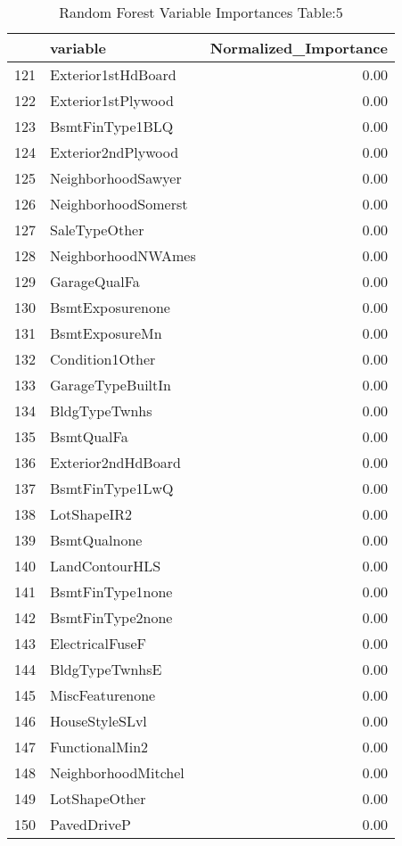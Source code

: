 \begin{table}[ht]
\centering
\begin{tabular}{rlr}
  \hline
 & variable & Normalized\_Importance \\ 
  \hline
121 & Exterior1stHdBoard & 0.00 \\ 
  122 & Exterior1stPlywood & 0.00 \\ 
  123 & BsmtFinType1BLQ & 0.00 \\ 
  124 & Exterior2ndPlywood & 0.00 \\ 
  125 & NeighborhoodSawyer & 0.00 \\ 
  126 & NeighborhoodSomerst & 0.00 \\ 
  127 & SaleTypeOther & 0.00 \\ 
  128 & NeighborhoodNWAmes & 0.00 \\ 
  129 & GarageQualFa & 0.00 \\ 
  130 & BsmtExposurenone & 0.00 \\ 
  131 & BsmtExposureMn & 0.00 \\ 
  132 & Condition1Other & 0.00 \\ 
  133 & GarageTypeBuiltIn & 0.00 \\ 
  134 & BldgTypeTwnhs & 0.00 \\ 
  135 & BsmtQualFa & 0.00 \\ 
  136 & Exterior2ndHdBoard & 0.00 \\ 
  137 & BsmtFinType1LwQ & 0.00 \\ 
  138 & LotShapeIR2 & 0.00 \\ 
  139 & BsmtQualnone & 0.00 \\ 
  140 & LandContourHLS & 0.00 \\ 
  141 & BsmtFinType1none & 0.00 \\ 
  142 & BsmtFinType2none & 0.00 \\ 
  143 & ElectricalFuseF & 0.00 \\ 
  144 & BldgTypeTwnhsE & 0.00 \\ 
  145 & MiscFeaturenone & 0.00 \\ 
  146 & HouseStyleSLvl & 0.00 \\ 
  147 & FunctionalMin2 & 0.00 \\ 
  148 & NeighborhoodMitchel & 0.00 \\ 
  149 & LotShapeOther & 0.00 \\ 
  150 & PavedDriveP & 0.00 \\ 
   \hline
\end{tabular}
\caption{Random Forest Variable Importances Table:5} 
\label{tab:importance5}
\end{table}

